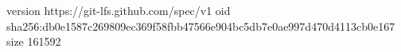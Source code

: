 version https://git-lfs.github.com/spec/v1
oid sha256:db0e1587c269809ec369f58fbb47566e904bc5db7e0ae997d470d4113cb0e167
size 161592
